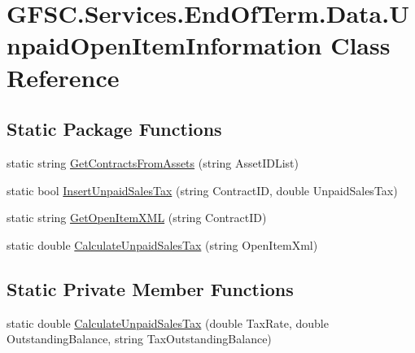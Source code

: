 \hypertarget{class_g_f_s_c_1_1_services_1_1_end_of_term_1_1_data_1_1_unpaid_open_item_information}{}\section{G\+F\+S\+C.\+Services.\+End\+Of\+Term.\+Data.\+Unpaid\+Open\+Item\+Information Class Reference}
\label{class_g_f_s_c_1_1_services_1_1_end_of_term_1_1_data_1_1_unpaid_open_item_information}
\subsection*{Static Package Functions}
\begin{DoxyCompactItemize}
\item 
static string \mbox{\hyperlink{class_g_f_s_c_1_1_services_1_1_end_of_term_1_1_data_1_1_unpaid_open_item_information_a6bcc624028be7618f55368db0d27ed5a}{Get\+Contracts\+From\+Assets}} (string Asset\+I\+D\+List)
\item 
static bool \mbox{\hyperlink{class_g_f_s_c_1_1_services_1_1_end_of_term_1_1_data_1_1_unpaid_open_item_information_a716ea6460e07f9d3936d54d69d2f00b1}{Insert\+Unpaid\+Sales\+Tax}} (string Contract\+ID, double Unpaid\+Sales\+Tax)
\item 
static string \mbox{\hyperlink{class_g_f_s_c_1_1_services_1_1_end_of_term_1_1_data_1_1_unpaid_open_item_information_ae467602ba9e152085874044bda6d5a3f}{Get\+Open\+Item\+X\+ML}} (string Contract\+ID)
\item 
static double \mbox{\hyperlink{class_g_f_s_c_1_1_services_1_1_end_of_term_1_1_data_1_1_unpaid_open_item_information_af45ce3ac375408f7e9807780a46d7c4e}{Calculate\+Unpaid\+Sales\+Tax}} (string Open\+Item\+Xml)
\end{DoxyCompactItemize}
\subsection*{Static Private Member Functions}
\begin{DoxyCompactItemize}
\item 
static double \mbox{\hyperlink{class_g_f_s_c_1_1_services_1_1_end_of_term_1_1_data_1_1_unpaid_open_item_information_a3dccdd2f92498cbf0dd25a4009e16f53}{Calculate\+Unpaid\+Sales\+Tax}} (double Tax\+Rate, double Outstanding\+Balance, string Tax\+Outstanding\+Balance)
\end{DoxyCompactItemize}



